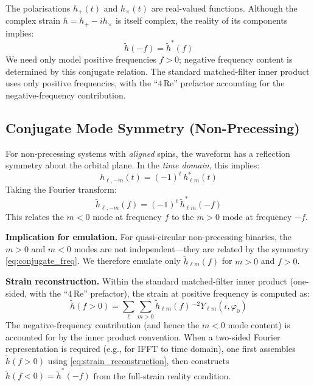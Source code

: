 \documentclass[11pt,a4paper]{article}
\newcommand{\htlm}{\tilde{h}_{\ell m}}
\newcommand{\Ylm}{{}^{-2}Y_{\ell m}}
\begin{document}
The polarisations $h_+(t)$ and $h_\times(t)$ are real-valued functions. Although the complex strain $h = h_+ - i h_\times$ is itself complex, the reality of its components implies:
\begin{equation}
    \tilde{h}(-f) = \tilde{h}^*(f)
\end{equation}
We need only model positive frequencies $f > 0$; negative frequency content is determined by this conjugate relation. The standard matched-filter inner product uses only positive frequencies, with the ``$4 \, \text{Re}$'' prefactor accounting for the negative-frequency contribution.

\subsection{Conjugate Mode Symmetry (Non-Precessing)}
\label{sec:conjugate_symmetry}

For non-precessing systems with \emph{aligned} spins, the waveform has a reflection symmetry about the orbital plane. In the \emph{time domain}, this implies:
\begin{equation}
    h_{\ell,-m}(t) = (-1)^\ell \, h_{\ell m}^*(t)
    \label{eq:conjugate_time}
\end{equation}
Taking the Fourier transform:
\begin{equation}
    \tilde{h}_{\ell,-m}(f) = (-1)^\ell \, \tilde{h}_{\ell m}^*(-f)
    \label{eq:conjugate_freq}
\end{equation}
This relates the $m < 0$ mode at frequency $f$ to the $m > 0$ mode at frequency $-f$.

\textbf{Implication for emulation.}
For quasi-circular non-precessing binaries, the $m > 0$ and $m < 0$ modes are not independent---they are related by the symmetry \eqref{eq:conjugate_freq}. We therefore emulate only $\htlm(f)$ for $m > 0$ and $f > 0$.

\textbf{Strain reconstruction.}
Within the standard matched-filter inner product (one-sided, with the ``$4\,\text{Re}$'' prefactor), the strain at positive frequency is computed as:
\begin{equation}
    \boxed{
    \tilde{h}(f > 0) = \sum_{\ell} \sum_{m > 0} \htlm(f) \, \Ylm(\iota, \varphi_0)
    }
    \label{eq:strain_reconstruction}
\end{equation}
The negative-frequency contribution (and hence the $m < 0$ mode content) is accounted for by the inner product convention. When a two-sided Fourier representation is required (e.g., for IFFT to time domain), one first assembles $\tilde{h}(f > 0)$ using \eqref{eq:strain_reconstruction}, then constructs $\tilde{h}(f < 0) = \tilde{h}^*(-f)$ from the full-strain reality condition.
\end{document}
